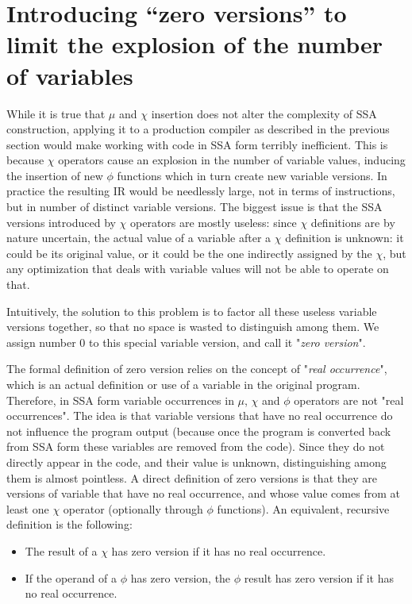 \section{Introducing ``zero versions'' to limit the explosion of the number of variables}

While it is true that $\mu$ and $\chi$ insertion does not alter the complexity of SSA construction, applying it to a production compiler as described in the previous section would make working with code in SSA form terribly inefficient.
This is because $\chi$ operators cause an explosion in the number of variable values, inducing the insertion of new $\phi$ functions which in turn create new variable versions.
In practice the resulting IR would be needlessly large, not in terms of instructions, but in number of distinct variable versions. The biggest issue is that the SSA versions introduced by $\chi$ operators are mostly useless: since $\chi$ definitions are by nature uncertain, the actual value of a variable after a $\chi$ definition is unknown: it could be its original value, or it could be the one indirectly assigned by the $\chi$, but any optimization that deals with variable values will not be able to operate on that.

Intuitively, the solution to this problem is to factor all these useless variable versions together, so that no space is wasted to distinguish among them. We assign number 0 to this special variable version, and call it "{\em zero version}".

The formal definition of zero version relies on the concept of "{\em real occurrence}", which is an actual definition or use of a variable in the original program. Therefore, in SSA form variable occurrences in $\mu$, $\chi$ and $\phi$ operators are not "real occurrences". The idea is that variable versions that have no real occurrence do not influence the program output (because once the program is converted back from SSA form these variables are removed from the code).
Since they do not directly appear in the code, and their value is unknown, distinguishing among them is almost pointless.
A direct definition of zero versions is that they are versions of variable that have no real occurrence, and whose value  comes from at least one $\chi$ operator (optionally through $\phi$ functions). An equivalent, recursive definition is the following:
\begin{itemize}
\item The result of a $\chi$ has zero version if it has no real occurrence.
\item If the operand of a $\phi$ has zero version, the $\phi$ result has zero version if it has no real occurrence.
\end{itemize}

